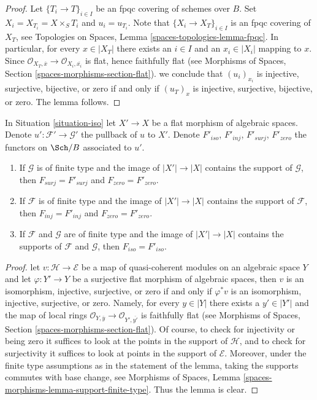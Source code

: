 \begin{proof}
Let $\{T_i \to T\}_{i \in I}$ be an fpqc covering of schemes over $B$.
Set $X_i = X_{T_i} = X \times_S T_i$ and $u_i = u_{T_i}$.
Note that $\{X_i \to X_T\}_{i \in I}$ is an fpqc covering of $X_T$, see
Topologies on Spaces, Lemma \ref{spaces-topologies-lemma-fpqc}.
In particular, for every $x \in |X_T|$ there exists an $i \in I$
and an $x_i \in |X_i|$ mapping to $x$. Since
$\mathcal{O}_{X_T, \overline{x}} \to \mathcal{O}_{X_i, \overline{x_i}}$
is flat, hence faithfully flat (see
Morphisms of Spaces, Section \ref{spaces-morphisms-section-flat}).
we conclude that $(u_i)_{x_i}$ is injective, surjective, bijective, or zero
if and only if $(u_T)_x$ is injective, surjective, bijective, or zero.
The lemma follows.
\end{proof}

\begin{lemma}
\label{lemma-iso-go-up}
In Situation \ref{situation-iso} let $X' \to X$ be a flat morphism
of algebraic spaces. Denote $u' : \mathcal{F}' \to \mathcal{G}'$
the pullback of $u$ to $X'$. Denote $F'_{iso}$, $F'_{inj}$, $F'_{surj}$,
$F'_{zero}$ the functors on $\Sch/B$ associated to $u'$.
\begin{enumerate}
\item If $\mathcal{G}$ is of finite type and the image of $|X'| \to |X|$
contains the support of $\mathcal{G}$, then $F_{surj} = F'_{surj}$
and $F_{zero} = F'_{zero}$.
\item If $\mathcal{F}$ is of finite type and the image of $|X'| \to |X|$
contains the support of $\mathcal{F}$, then $F_{inj} = F'_{inj}$
and $F_{zero} = F'_{zero}$.
\item If $\mathcal{F}$ and $\mathcal{G}$ are of finite type and the image of
$|X'| \to |X|$ contains the supports of $\mathcal{F}$ and $\mathcal{G}$,
then $F_{iso} = F'_{iso}$.
\end{enumerate}
\end{lemma}

\begin{proof}
let $v : \mathcal{H} \to \mathcal{E}$ be a map of quasi-coherent
modules on an algebraic space $Y$ and let $\varphi : Y' \to Y$ be a
surjective flat morphism of algebraic spaces, then $v$ is
an isomorphism, injective, surjective, or zero if and only if $\varphi^*v$ is
an isomorphism, injective, surjective, or zero. Namely,
for every $y \in |Y|$ there exists a $y' \in |Y'|$ and the map
of local rings
$\mathcal{O}_{Y, \overline{y}} \to \mathcal{O}_{Y', \overline{y'}}$
is faithfully flat (see
Morphisms of Spaces, Section \ref{spaces-morphisms-section-flat}).
Of course, to check for injectivity or being zero it suffices to look
at the points in the support of $\mathcal{H}$, and to check for
surjectivity it suffices to look at points in the support of $\mathcal{E}$.
Moreover, under the finite type assumptions as in the statement of
the lemma, taking the supports commutes with base change, see
Morphisms of Spaces, Lemma \ref{spaces-morphisms-lemma-support-finite-type}.
Thus the lemma is clear.
\end{proof}

